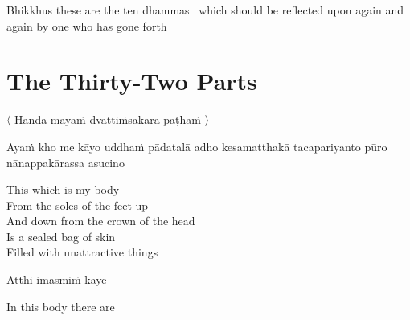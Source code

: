 \begin{english-hang}
  Bhikkhus these are the ten dhammas \breathmark\ which should be reflected upon again and again by one who has gone forth
\end{english-hang}

\suttaRef{[AN 10.48]}


\section{The Thirty-Two Parts}
\label{32-parts}

\begin{leader}
  〈 Handa mayaṁ dvattiṁsākāra-pāṭhaṁ 〉
\end{leader}

\begin{pali-hang}
Ayaṁ kho me kāyo uddhaṁ pādatalā adho kesamatthakā tacapariyanto pūro nānappakārassa asucino
\end{pali-hang}

\begin{english-verses}
  This which is my body\\
  From the soles of the feet up\\
  And down from the crown of the head\\
  Is a sealed bag of skin\\
  Filled with unattractive things
\end{english-verses}

Atthi imasmiṁ kāye

\begin{english}
  In this body there are
\end{english}

